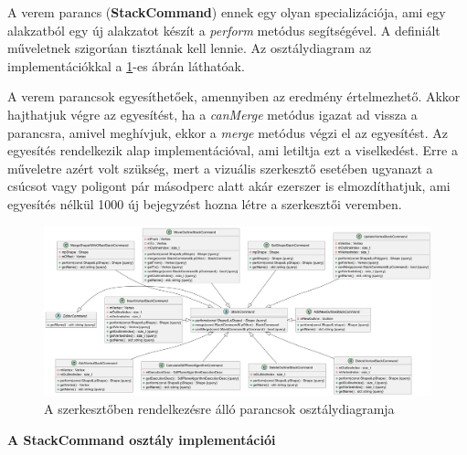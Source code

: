 A verem parancs (\textbf{StackCommand}) ennek egy olyan specializációja, ami egy alakzatból egy új alakzatot készít a \textit{perform} metódus segítségével. A definiált műveletnek szigorúan tisztának kell lennie. Az osztálydiagram az implementációkkal a \ref{fig:class_editor_command-1}-es ábrán láthatóak.

A verem parancsok egyesíthetőek, amennyiben az eredmény értelmezhető. Akkor hajthatjuk végre az egyesítést, ha a \textit{canMerge} metódus igazat ad vissza a parancsra, amivel meghívjuk, ekkor a \textit{merge} metódus végzi el az egyesítést. Az egyesítés rendelkezik alap implementációval, ami letiltja ezt a viselkedést. Erre a műveletre azért volt szükség, mert a vizuális szerkesztő esetében ugyanazt a csúcsot vagy poligont pár másodperc alatt akár ezerszer is elmozdíthatjuk, ami egyesítés nélkül 1000 új bejegyzést hozna létre a szerkesztői veremben.

\begin{figure}[H]
    \centering
    \includegraphics[width=1\linewidth]{images/class_editor_command.png}
    \caption{A szerkesztőben rendelkezésre álló parancsok osztálydiagramja}
    \label{fig:class_editor_command-1}
\end{figure}

\textbf{A StackCommand osztály implementációi}

